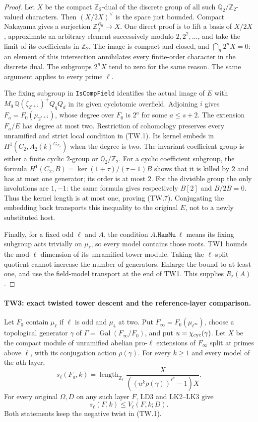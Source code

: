 \begin{proof}
Let $X$ be the compact $\mathbb Z_2$-dual of the discrete group
of all such $\mathbb Q_2/\mathbb Z_2$-valued characters.
Then $(X/2X)^\vee$ is the space just bounded.  Compact Nakayama
gives a surjection $\mathbb Z_2^{R_0}\to X$.
One direct proof is to lift a basis of $X/2X$, approximate an
arbitrary element successively modulo $2,2^2,\ldots$, and take
the limit of its coefficients in $\mathbb Z_2$.
The image is compact and closed, and $\bigcap_n2^nX=0$:
an element of this intersection annihilates every finite-order
character in the discrete dual.  The subgroups $2^nX$ tend to
zero for the same reason.
The same argument applies to every prime $\ell$.

The fixing subgroup in \texttt{IsCompField} identifies the actual
image of $E$ with
$M_0\,\mathbb Q(\zeta_{2^{s+2}})^+ Q_qQ_d$ in its given
cyclotomic overfield.  Adjoining $i$ gives
$F_a=F_0(\mu_{2^{s+2}})$, whose degree over $F_0$ is $2^a$
for some $a\le s+2$.  The extension $F_a/E$ has degree at most
two.  Restriction of cohomology preserves every unramified and
strict local condition in (TW.1).  Its kernel embeds in
$H^1(C_2,A_2(k)^{G_{F_a}})$ when the degree is two.
The invariant coefficient group is either a finite cyclic
$2$-group or $\mathbb Q_2/\mathbb Z_2$.
For a cyclic coefficient subgroup, the formula
$H^1(C_2,B)=\ker(1+\tau)/(\tau-1)B$ shows that it is killed by
$2$ and has at most one generator; its order is at most $2$.
For the divisible group the only involutions are $1,-1$:
the same formula gives respectively $B[2]$ and $B/2B=0$.
Thus the kernel length is at most one, proving (TW.7).
Conjugating the embedding back transports this inequality to
the original $E$, not to a newly substituted host.

Finally, for a fixed odd $\ell$ and $A$, the condition
$A.\texttt{HasMu}\ \ell$ means its fixing subgroup acts trivially
on $\mu_\ell$, so every model contains those roots.
TW1 bounds the mod-$\ell$
dimension of its unramified tower module.  Taking the
$\ell$-split quotient cannot increase the number of generators.
Enlarge the bound to at least one, and use the field-model
transport at the end of TW1.  This supplies $R_\ell(A)$.
\end{proof}

\paragraph{TW3: exact twisted tower descent and the reference-layer comparison.}
\label{claim:TW3}
Let $F_0$ contain $\mu_\ell$ if $\ell$ is odd and $\mu_4$ at two.
Put $F_\infty=F_0(\mu_{\ell^\infty})$, choose a topological
generator $\gamma$ of $\Gamma=\operatorname{Gal}(F_\infty/F_0)$,
and put $u=\chi_{\rm cyc}(\gamma)$.
Let $X$ be the compact module of unramified abelian pro-$\ell$
extensions of $F_\infty$ split at primes above $\ell$,
with its conjugation action $\rho(\gamma)$.
For every $k\ge1$ and every model of the $a$th layer,
\[
 s_\ell(F_a,k)=
 \operatorname{length}_{\mathbb Z_\ell}
 \frac{X}{((u^k\rho(\gamma))^{\ell^a}-1)X}.              \tag{TW.11}
\]
For every original $\Omega,D$ on any such layer $F$, LD3 and
LK2--LK3 give
\[
                         s_\ell(F,k)\le V_\ell(F,k;D).
 \tag{TW.12}
\]
Both statements keep the negative twist in (TW.1).

